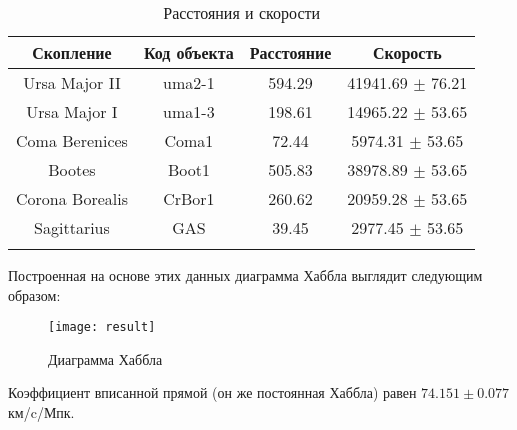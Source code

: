 \begin{table}[h]
  \centering
  \caption{Расстояния и скорости}
  \begin{tabular}{cccc}
    \toprule
    Скопление &
    Код объекта &
    Расстояние &
    Скорость \\
    \midrule
    Ursa Major II & uma2-1 & 594.29 & 41941.69 $\pm$ 76.21 \\
    \arrayrulecolor{black!40}
    \midrule
    Ursa Major I & uma1-3 & 198.61 & 14965.22 $\pm$ 53.65 \\
    \midrule
    Coma Berenices & Coma1 & 72.44 & 5974.31 $\pm$ 53.65 \\
    \midrule
    Bootes & Boot1 & 505.83 & 38978.89 $\pm$ 53.65 \\
    \midrule
    Corona Borealis & CrBor1 & 260.62 & 20959.28 $\pm$ 53.65 \\
    \midrule
    Sagittarius & GAS & 39.45 & 2977.45 $\pm$ 53.65 \\
    \arrayrulecolor{black}
    \bottomrule
  \end{tabular}
\end{table}

Построенная на основе этих данных диаграмма Хаббла выглядит следующим образом:

\begin{figure}[h]
  \centering
  \texttt{[image: result]}
  \caption{Диаграмма Хаббла}
\end{figure}

Коэффициент вписанной прямой (он же постоянная Хаббла) равен $ 74.151 \pm 0.077 $ км/c/Мпк.

